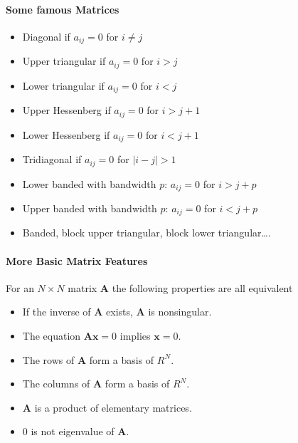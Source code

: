 \documentclass[letterpaper,10pt,english]{sphinxmanual}
\begin{document}
\paragraph{Some famous Matrices}
\label{\detokenize{chapter2:some-famous-matrices}}\begin{itemize}
\item {} 
Diagonal if \(a_{ij}=0\) for \(i\ne j\)

\item {} 
Upper triangular if \(a_{ij}=0\) for \(i > j\)

\item {} 
Lower triangular if \(a_{ij}=0\) for \(i < j\)

\item {} 
Upper Hessenberg if \(a_{ij}=0\) for \(i > j+1\)

\item {} 
Lower Hessenberg if \(a_{ij}=0\) for \(i < j+1\)

\item {} 
Tridiagonal if \(a_{ij}=0\) for \(|i -j| > 1\)

\item {} 
Lower banded with bandwidth \(p\): \(a_{ij}=0\) for \(i > j+p\)

\item {} 
Upper banded with bandwidth \(p\): \(a_{ij}=0\) for \(i < j+p\)

\item {} 
Banded, block upper triangular, block lower triangular….

\end{itemize}


\paragraph{More Basic Matrix Features}
\label{\detokenize{chapter2:more-basic-matrix-features}}

For an \(N\times N\) matrix  \(\mathbf{A}\) the following properties are all equivalent
\begin{itemize}
\item {} 
If the inverse of \(\mathbf{A}\) exists, \(\mathbf{A}\) is nonsingular.

\item {} 
The equation \(\mathbf{Ax}=0\) implies \(\mathbf{x}=0\).

\item {} 
The rows of \(\mathbf{A}\) form a basis of \(R^N\).

\item {} 
The columns of \(\mathbf{A}\) form a basis of \(R^N\).

\item {} 
\(\mathbf{A}\) is a product of elementary matrices.

\item {} 
\(0\) is not eigenvalue of \(\mathbf{A}\).

\end{itemize}
\end{document}
